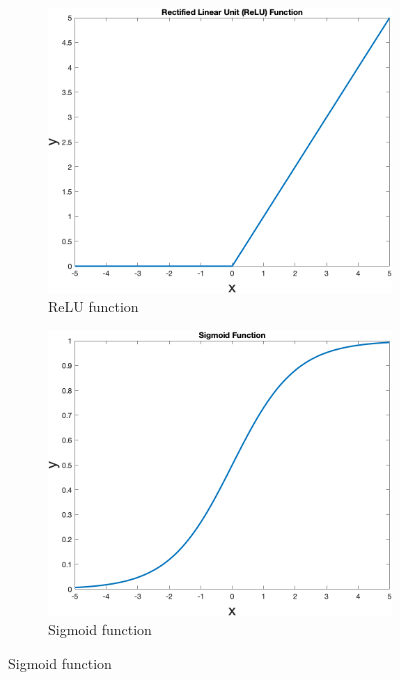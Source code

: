 \begin{figure}
    \centering
    \begin{subfigure}[b]{0.4\textwidth}
        \includegraphics[width=\textwidth]{figures/relu}
        \caption{ReLU function}
        \label{fig:relu}
    \end{subfigure}
    \hspace{0.1\textwidth}
    \begin{subfigure}[b]{0.4\textwidth}
        \includegraphics[width=\textwidth]{figures/sigmoid}
        \caption{Sigmoid function}

\end{subfigure}
\end{figure}
